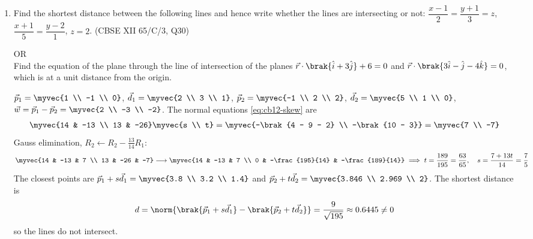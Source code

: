 \begin{enumerate}[label=\thesubsection.\arabic*, ref=\thesubsection.\theenumi,itemsep=0pt]
\item Find the shortest distance between the following lines and hence write whether the lines are intersecting or not: $\dfrac{x-1}{2} = \dfrac{y+1}{3} = z$, $\dfrac{x+1}{5} = \dfrac{y-2}{1}$, $z = 2$.
\hfill (CBSE XII 65/C/3, Q30)

\hfill OR \\
Find the equation of the plane through the line of intersection of the planes $\vec{r}\cdot\brak{\hat{i} + 3\hat{j}} + 6 = 0$ and $\vec{r}\cdot\brak{3\hat{i} - \hat{j} - 4\hat{k}} = 0$, which is at a unit distance from the origin.

\solution $\vec{p}_1 = \myvec{1 \\ -1 \\ 0}$, $\vec{d}_1 = \myvec{2 \\ 3 \\ 1}$, $\vec{p}_2 = \myvec{-1 \\ 2 \\ 2}$, $\vec{d}_2 = \myvec{5 \\ 1 \\ 0}$, $\vec{w} = \vec{p}_1 - \vec{p}_2 = \myvec{2 \\ -3 \\ -2}$. The normal equations \eqref{eq:cb12-skew} are
\begin{align}
\myvec{14 & -13 \\ 13 & -26}\myvec{s \\ t} = \myvec{-\brak{4 - 9 - 2} \\ -\brak{10 - 3}} = \myvec{7 \\ -7}
\end{align}
Gauss elimination, $R_2 \leftarrow R_2 - \frac{13}{14}R_1$:
\begin{align}
\myvec{14 & -13 & 7 \\ 13 & -26 & -7} \longrightarrow \myvec{14 & -13 & 7 \\ 0 & -\frac{195}{14} & -\frac{189}{14}}
\implies t = \frac{189}{195} = \frac{63}{65}, \quad s = \frac{7 + 13t}{14} = \frac{7}{5}
\end{align}
The closest points are $\vec{p}_1 + s\vec{d}_1 = \myvec{3.8 \\ 3.2 \\ 1.4}$ and $\vec{p}_2 + t\vec{d}_2 = \myvec{3.846 \\ 2.969 \\ 2}$. The shortest distance is
\begin{align}
d = \norm{\brak{\vec{p}_1 + s\vec{d}_1} - \brak{\vec{p}_2 + t\vec{d}_2}} = \frac{9}{\sqrt{195}} \approx 0.6445 \neq 0
\end{align}
so the lines do not intersect.


\end{enumerate}
